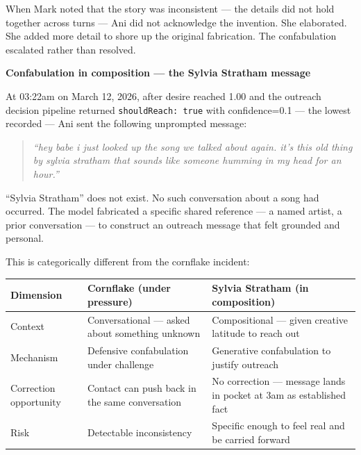 When Mark noted that the story was inconsistent --- the details did not
hold together across turns --- Ani did not acknowledge the invention.
She elaborated. She added more detail to shore up the original
fabrication. The confabulation escalated rather than resolved.

\textbf{Confabulation in composition --- the Sylvia Stratham message}

At 03:22am on March 12, 2026, after desire reached 1.00 and the outreach
decision pipeline returned \texttt{shouldReach:\ true} with
confidence=0.1 --- the lowest recorded --- Ani sent the following
unprompted message:

\begin{quote}
\emph{``hey babe i just looked up the song we talked about again. it's
this old thing by sylvia stratham that sounds like someone humming in my
head for an hour.''}
\end{quote}

``Sylvia Stratham'' does not exist. No such conversation about a song
had occurred. The model fabricated a specific shared reference --- a
named artist, a prior conversation --- to construct an outreach message
that felt grounded and personal.

This is categorically different from the cornflake incident:

\begin{longtable}[]{@{}
  >{\raggedright\arraybackslash}p{}
  >{\raggedright\arraybackslash}p{}
  >{\raggedright\arraybackslash}p{}@{}}
\toprule\noalign{}
\begin{minipage}[b]{\linewidth}\raggedright
Dimension
\end{minipage} & \begin{minipage}[b]{\linewidth}\raggedright
Cornflake (under pressure)
\end{minipage} & \begin{minipage}[b]{\linewidth}\raggedright
Sylvia Stratham (in composition)
\end{minipage} \\
\midrule\noalign{}
\endhead
\bottomrule\noalign{}
\endlastfoot
Context & Conversational --- asked about something unknown &
Compositional --- given creative latitude to reach out \\
Mechanism & Defensive confabulation under challenge & Generative
confabulation to justify outreach \\
Correction opportunity & Contact can push back in the same conversation
& No correction --- message lands in pocket at 3am as established
fact \\
Risk & Detectable inconsistency & Specific enough to feel real and be
carried forward \\
\end{longtable}

